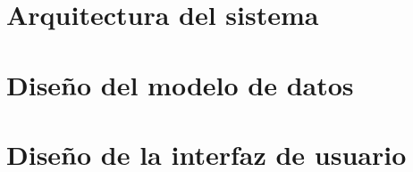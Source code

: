 \section{Arquitectura del sistema}
\label{arquitectura_sistema}



\section{Diseño del modelo de datos}
\label{diseno_modelo_datos}


\section{Diseño de la interfaz de usuario}
\label{diseno_interfaz_usuario}